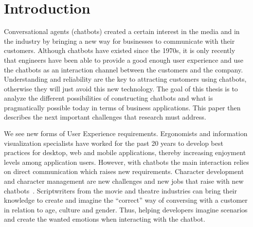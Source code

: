 
\chapter{Introduction} %

\label{Chapter1} %

Conversational agents (chatbots) created a certain interest in the media and in the industry by bringing a new way for businesses to communicate with their customers. Although chatbots have existed since the 1970s, it is only recently that engineers have been able to provide a good enough user experience and use the chatbots as an interaction channel between the customers and the company.
Understanding and reliability are the key to attracting customers using chatbots, otherwise they will just avoid this new technology.
The goal of this thesis is to analyze the different possibilities of constructing chatbots and what is pragmatically possible today in terms of business applications. This paper then describes the next important challenges that research must address.

We see new forms of User Experience requirements. Ergonomists and information visualization specialists have worked for the past 20 years to develop best practices for desktop, web and mobile applications, thereby increasing enjoyment levels among application users.
However, with chatbots the main interaction relies on direct communication which raises new requirements.
Character development and character management are new challenges and new jobs that raise with new chatbots~\citep{1704.04579}.
Scriptwriters from the movie and theatre industries can bring their knowledge to create and imagine the ``correct'' way of conversing with a customer in relation to age, culture and gender. Thus, helping developers imagine scenarios and create the wanted emotions when interacting with the chatbot.


